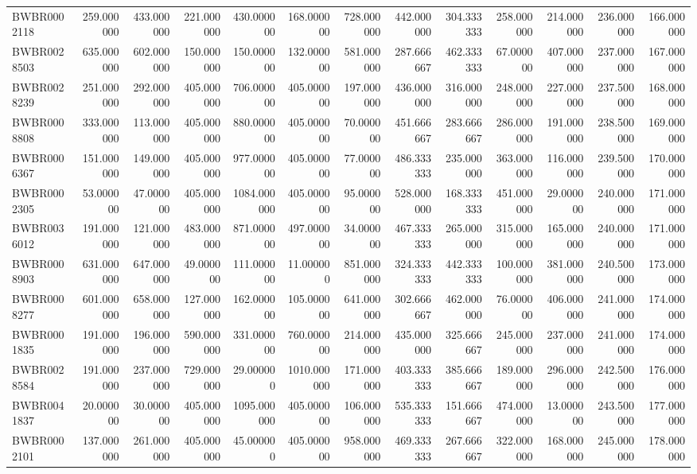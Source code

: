 \begin{longtable}{lrrrrrrrrrrrr}
BWBR0002118 & 259.000000 & 433.000000 & 221.000000 & 430.000000 & 168.000000 & 728.000000 & 442.000000 & 304.333333 & 258.000000 & 214.000000 & 236.000000 & 166.000000 \\
BWBR0028503 & 635.000000 & 602.000000 & 150.000000 & 150.000000 & 132.000000 & 581.000000 & 287.666667 & 462.333333 & 67.000000 & 407.000000 & 237.000000 & 167.000000 \\
BWBR0028239 & 251.000000 & 292.000000 & 405.000000 & 706.000000 & 405.000000 & 197.000000 & 436.000000 & 316.000000 & 248.000000 & 227.000000 & 237.500000 & 168.000000 \\
BWBR0008808 & 333.000000 & 113.000000 & 405.000000 & 880.000000 & 405.000000 & 70.000000 & 451.666667 & 283.666667 & 286.000000 & 191.000000 & 238.500000 & 169.000000 \\
BWBR0006367 & 151.000000 & 149.000000 & 405.000000 & 977.000000 & 405.000000 & 77.000000 & 486.333333 & 235.000000 & 363.000000 & 116.000000 & 239.500000 & 170.000000 \\
BWBR0002305 & 53.000000 & 47.000000 & 405.000000 & 1084.000000 & 405.000000 & 95.000000 & 528.000000 & 168.333333 & 451.000000 & 29.000000 & 240.000000 & 171.000000 \\
BWBR0036012 & 191.000000 & 121.000000 & 483.000000 & 871.000000 & 497.000000 & 34.000000 & 467.333333 & 265.000000 & 315.000000 & 165.000000 & 240.000000 & 171.000000 \\
BWBR0008903 & 631.000000 & 647.000000 & 49.000000 & 111.000000 & 11.000000 & 851.000000 & 324.333333 & 442.333333 & 100.000000 & 381.000000 & 240.500000 & 173.000000 \\
BWBR0008277 & 601.000000 & 658.000000 & 127.000000 & 162.000000 & 105.000000 & 641.000000 & 302.666667 & 462.000000 & 76.000000 & 406.000000 & 241.000000 & 174.000000 \\
BWBR0001835 & 191.000000 & 196.000000 & 590.000000 & 331.000000 & 760.000000 & 214.000000 & 435.000000 & 325.666667 & 245.000000 & 237.000000 & 241.000000 & 174.000000 \\
BWBR0028584 & 191.000000 & 237.000000 & 729.000000 & 29.000000 & 1010.000000 & 171.000000 & 403.333333 & 385.666667 & 189.000000 & 296.000000 & 242.500000 & 176.000000 \\
BWBR0041837 & 20.000000 & 30.000000 & 405.000000 & 1095.000000 & 405.000000 & 106.000000 & 535.333333 & 151.666667 & 474.000000 & 13.000000 & 243.500000 & 177.000000 \\
BWBR0002101 & 137.000000 & 261.000000 & 405.000000 & 45.000000 & 405.000000 & 958.000000 & 469.333333 & 267.666667 & 322.000000 & 168.000000 & 245.000000 & 178.000000 \\

\end{longtable}
